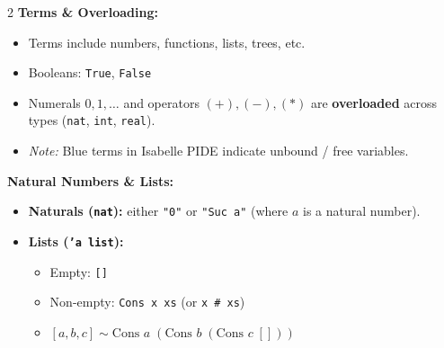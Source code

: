 \documentclass[10pt,a4paper]{article}
\begin{document}
\vspace{0.3em}

\begin{tcolorbox}[title=2. Types \& Terms in Isabelle]
\begin{multicols}{2}
\textbf{Terms \& Overloading:}
\begin{itemize}[leftmargin=1.2em, itemsep=2pt]
    \item Terms include numbers, functions, lists, trees, etc.
    \item Booleans: \texttt{True}, \texttt{False}
    \item Numerals $0, 1, \dots$ and operators $(+), (-), (*)$ are \textbf{overloaded} across types (\texttt{nat}, \texttt{int}, \texttt{real}).
    \item \textit{Note:} Blue terms in Isabelle PIDE indicate unbound / free variables.
\end{itemize}

\textbf{Natural Numbers \& Lists:}
\begin{itemize}[leftmargin=1.2em, itemsep=2pt]
    \item \textbf{Naturals (\texttt{nat}):} either \texttt{"0"} or \texttt{"Suc a"} (where $a$ is a natural number).
    \item \textbf{Lists (\texttt{'a list}):}
    \begin{itemize}[leftmargin=1em, label=$\bullet$]
        \item Empty: \texttt{[]}
        \item Non-empty: \texttt{Cons x xs} (or \texttt{x \# xs})
        \item $[a, b, c] \sim \text{Cons } a \; (\text{Cons } b \; (\text{Cons } c \; []))$
    \end{itemize}
\end{itemize}

\columnbreak


\end{multicols}
\end{tcolorbox}
\end{document}
